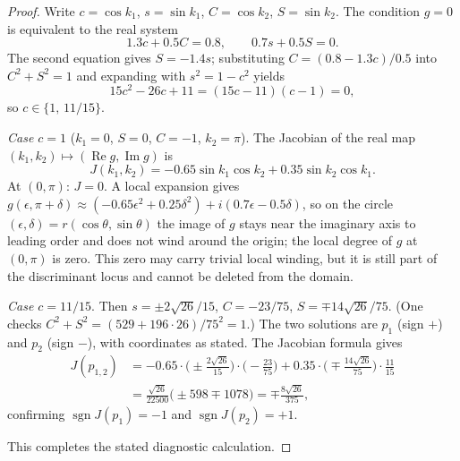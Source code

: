 \documentclass[11pt]{article}
\numberwithin{equation}{section}
\DeclareMathOperator{\sgn}{sgn}
\begin{document}
\begin{proof}
Write $c=\cos k_1$, $s=\sin k_1$, $C=\cos k_2$, $S=\sin k_2$.  The
condition $g=0$ is equivalent to the real system
\[
  1.3c+0.5C=0.8,\qquad 0.7s+0.5S=0.
\]
The second equation gives $S=-1.4s$; substituting $C=(0.8-1.3c)/0.5$ into
$C^2+S^2=1$ and expanding with $s^2=1-c^2$ yields
\[
  15c^2-26c+11=(15c-11)(c-1)=0,
\]
so $c\in\{1,\,11/15\}$.

\emph{Case $c=1$} ($k_1=0$, $S=0$, $C=-1$, $k_2=\pi$).
The Jacobian of the real map $(k_1,k_2)\mapsto(\operatorname{Re}g,\operatorname{Im}g)$ is
\[
  J(k_1,k_2)=-0.65\sin k_1\cos k_2+0.35\sin k_2\cos k_1.
\]
At $(0,\pi)$: $J=0$.  A local expansion gives
$g(\epsilon,\pi+\delta)\approx(-0.65\epsilon^2+0.25\delta^2)+i(0.7\epsilon-0.5\delta)$,
so on the circle $(\epsilon,\delta)=r(\cos\theta,\sin\theta)$ the
image of $g$ stays near the imaginary axis to leading order and does not
wind around the origin; the local degree of $g$ at $(0,\pi)$ is zero.
This zero may carry trivial local winding, but it is still part of the
discriminant locus and cannot be deleted from the domain.

\emph{Case $c=11/15$}.  Then $s=\pm2\sqrt{26}/15$,
$C=-23/75$, $S=\mp14\sqrt{26}/75$.  (One checks $C^2+S^2=(529+196\cdot26)/75^2=1$.)
The two solutions are $p_1$ (sign $+$) and $p_2$ (sign $-$), with coordinates
as stated.  The Jacobian formula gives
\begin{align*}
  J(p_{1,2})
  &=-0.65\cdot\bigl(\pm\tfrac{2\sqrt{26}}{15}\bigr)\cdot\bigl(-\tfrac{23}{75}\bigr)
   +0.35\cdot\bigl(\mp\tfrac{14\sqrt{26}}{75}\bigr)\cdot\tfrac{11}{15}\\
  &=\frac{\sqrt{26}}{22500}\bigl(\pm598\mp1078\bigr)
   =\mp\frac{8\sqrt{26}}{375},
\end{align*}
confirming $\sgn J(p_1)=-1$ and $\sgn J(p_2)=+1$.

This completes the stated diagnostic calculation.
\end{proof}

\appendix
\end{document}

